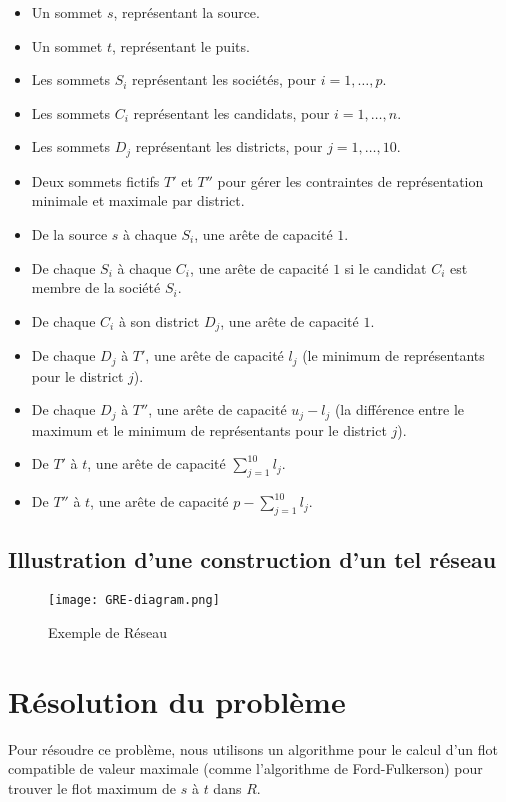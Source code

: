 \documentclass[11pt, a4paper]{article}
\begin{document}
\begin{itemize}
    \item Un sommet $s$, représentant la source.
    \item Un sommet $t$, représentant le puits.
    \item Les sommets $S_i$ représentant les sociétés, pour $i = 1, \ldots, p$.
    \item Les sommets $C_i$ représentant les candidats, pour $i = 1, \ldots, n$.
    \item Les sommets $D_j$ représentant les districts, pour $j = 1, \ldots, 10$.
    \item Deux sommets fictifs $T'$ et $T''$ pour gérer les contraintes de représentation minimale et maximale par district.
    \item De la source $s$ à chaque $S_i$, une arête de capacité $1$.
    \item De chaque $S_i$ à chaque $C_i$, une arête de capacité $1$ si le candidat $C_i$ est membre de la société $S_i$.
    \item De chaque $C_i$ à son district $D_j$, une arête de capacité $1$.
    \item De chaque $D_j$ à $T'$, une arête de capacité $l_j$ (le minimum de représentants pour le district $j$).
    \item De chaque $D_j$ à $T''$, une arête de capacité $u_j - l_j$ (la différence entre le maximum et le minimum de représentants pour le district $j$).
    \item De $T'$ à $t$, une arête de capacité $\sum_{j=1}^{10} l_j$.
    \item De $T''$ à $t$, une arête de capacité $p - \sum_{j=1}^{10} l_j$.
\end{itemize}
\pagebreak
\subsection {Illustration d'une construction d'un tel réseau}

\begin{figure}[H]
    \centering
    \texttt{[image: GRE-diagram.png]}
    \caption{Exemple de Réseau}
    \label{fig:exemple-reseau}
\end{figure}

\section{Résolution du problème}
Pour résoudre ce problème, nous utilisons un algorithme pour le calcul d’un flot compatible de valeur maximale (comme l'algorithme de Ford-Fulkerson) pour trouver le flot maximum de $s$ à $t$ dans $R$.
\end{document}
